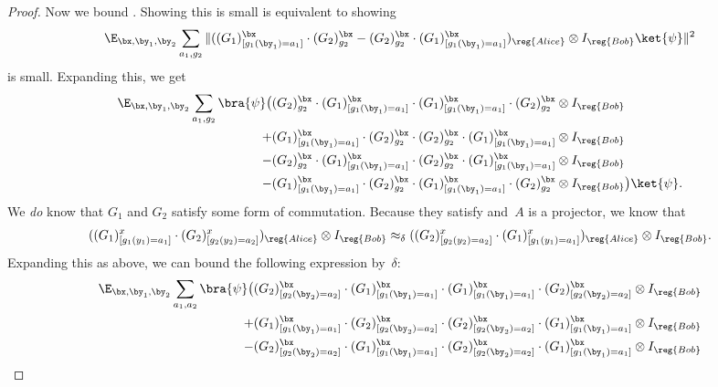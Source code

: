 \begin{proof}
Now we bound .
Showing this is small is equivalent to showing
\begin{equation*}
\E_{\bx, \by_1, \by_2}
\sum_{a_1, g_2}\Vert ((G_1)^{\bx}_{[g_1(\by_1) = a_1]}
	\cdot (G_2)^{\bx}_{g_2}- (G_2)^{\bx}_{g_2} \cdot (G_1)^{\bx}_{[g_1(\by_1) = a_1]})_{\reg{Alice}} \otimes I_{\reg{Bob}} \ket{\psi} \Vert^2
\end{equation*}
is small.  Expanding this, we get
\begin{align}
\E_{\bx, \by_1, \by_2} \sum_{a_1, g_2} \bra{\psi}\big(
	&(G_2)^{\bx}_{g_2} \cdot (G_1)^{\bx}_{[g_1(\by_1) = a_1]} \cdot (G_1)^{\bx}_{[g_1(\by_1) = a_1]} \cdot (G_2)^{\bx}_{g_2} \otimes I_{\reg{Bob}}\nonumber\\
	+ &(G_1)^{\bx}_{[g_1(\by_1) = a_1]} \cdot (G_2)^{\bx}_{g_2} \cdot (G_2)^{\bx}_{g_2} \cdot (G_1)^{\bx}_{[g_1(\by_1) = a_1]} \otimes I_{\reg{Bob}}\nonumber\\
	- &(G_2)^{\bx}_{g_2} \cdot (G_1)^{\bx}_{[g_1(\by_1) = a_1]} \cdot (G_2)^{\bx}_{g_2} \cdot (G_1)^{\bx}_{[g_1(\by_1) = a_1]} \otimes I_{\reg{Bob}}\nonumber\\
	- &(G_1)^{\bx}_{[g_1(\by_1) = a_1]} \cdot (G_2)^{\bx}_{g_2} \cdot (G_1)^{\bx}_{[g_1(\by_1) = a_1]} \cdot (G_2)^{\bx}_{g_2} \otimes I_{\reg{Bob}} \big)\ket{\psi}.\label{eq:burger-king}
\end{align}
We \emph{do} know that $G_1$ and $G_2$ satisfy some form of commutation.
Because they satisfy  and~$A$ is a projector, 
we know that
\begin{equation*}
((G_1)^x_{[g_1(y_1)=a_1]} \cdot (G_2)^x_{[g_2(y_2) = a_2]})_{\reg{Alice}} \otimes I_{\reg{Bob}}
\approx_{\delta} ((G_2)^x_{[g_2(y_2) = a_2]} \cdot (G_1)^x_{[g_1(y_1)=a_1]})_{\reg{Alice}} \otimes I_{\reg{Bob}}.
\end{equation*}
Expanding this as above, we can bound the following expression by~$\delta$:
\begin{align}
\E_{\bx, \by_1, \by_2} \sum_{a_1, a_2} \bra{\psi}\big(
	&(G_2)^\bx_{[g_2(\by_2) = a_2]} \cdot (G_1)^{\bx}_{[g_1(\by_1) = a_1]} \cdot (G_1)^{\bx}_{[g_1(\by_1) = a_1]} \cdot (G_2)^\bx_{[g_2(\by_2) = a_2]} \otimes I_{\reg{Bob}}\nonumber\\
	+ &(G_1)^{\bx}_{[g_1(\by_1) = a_1]} \cdot (G_2)^\bx_{[g_2(\by_2) = a_2]} \cdot (G_2)^\bx_{[g_2(\by_2) = a_2]} \cdot (G_1)^{\bx}_{[g_1(\by_1) = a_1]} \otimes I_{\reg{Bob}}\nonumber\\
	- &(G_2)^\bx_{[g_2(\by_2) = a_2]} \cdot (G_1)^{\bx}_{[g_1(\by_1) = a_1]} \cdot (G_2)^\bx_{[g_2(\by_2) = a_2]} \cdot (G_1)^{\bx}_{[g_1(\by_1) = a_1]} \otimes I_{\reg{Bob}}\nonumber\\

\end{align}
\end{proof}
